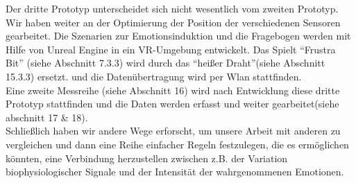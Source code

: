 Der dritte Prototyp unterscheidet sich nicht wesentlich vom zweiten Prototyp. Wir haben weiter an der Optimierung der Position der verschiedenen Sensoren gearbeitet. Die Szenarien zur Emotionsinduktion und die Fragebogen werden mit Hilfe von Unreal Engine in ein VR-Umgebung entwickelt. Das Spielt ``Frustra Bit'' (siehe Abschnitt 7.3.3) wird durch das “heißer Draht”(siehe Abschnitt 15.3.3) ersetzt. und die Datenübertragung wird per Wlan stattfinden. \\

Eine zweite Messreihe (siehe Abschnitt 16) wird nach Entwicklung diese dritte Prototyp stattfinden und die Daten werden erfasst und weiter gearbeitet(siehe abschnitt 17 \& 18). \\

Schließlich haben wir andere Wege erforscht, um unsere Arbeit mit anderen zu vergleichen und dann eine Reihe einfacher Regeln festzulegen, die es ermöglichen könnten, eine Verbindung herzustellen zwischen z.B. der Variation biophysiologischer Signale und der Intensität der wahrgenommenen Emotionen. \\